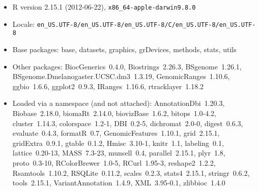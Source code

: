 \documentclass[11pt, oneside]{article}\usepackage{graphicx, color}
\begin{document}
\begin{itemize}\raggedright
  \item R version 2.15.1 (2012-06-22), \verb|x86_64-apple-darwin9.8.0|
  \item Locale: \verb|en_US.UTF-8/en_US.UTF-8/en_US.UTF-8/C/en_US.UTF-8/en_US.UTF-8|
  \item Base packages: base, datasets, graphics, grDevices, methods,
    stats, utils
  \item Other packages: BiocGenerics~0.4.0, Biostrings~2.26.3,
    BSgenome~1.26.1, BSgenome.Dmelanogaster.UCSC.dm3~1.3.19,
    GenomicRanges~1.10.6, ggbio~1.6.6, ggplot2~0.9.3, IRanges~1.16.6,
    rtracklayer~1.18.2
  \item Loaded via a namespace (and not attached):
    AnnotationDbi~1.20.3, Biobase~2.18.0, biomaRt~2.14.0,
    biovizBase~1.6.2, bitops~1.0-4.2, cluster~1.14.3, colorspace~1.2-1,
    DBI~0.2-5, dichromat~2.0-0, digest~0.6.3, evaluate~0.4.3,
    formatR~0.7, GenomicFeatures~1.10.1, grid~2.15.1, gridExtra~0.9.1,
    gtable~0.1.2, Hmisc~3.10-1, knitr~1.1, labeling~0.1,
    lattice~0.20-13, MASS~7.3-23, munsell~0.4, parallel~2.15.1,
    plyr~1.8, proto~0.3-10, RColorBrewer~1.0-5, RCurl~1.95-3,
    reshape2~1.2.2, Rsamtools~1.10.2, RSQLite~0.11.2, scales~0.2.3,
    stats4~2.15.1, stringr~0.6.2, tools~2.15.1,
    VariantAnnotation~1.4.9, XML~3.95-0.1, zlibbioc~1.4.0
\end{itemize}
\end{document}
